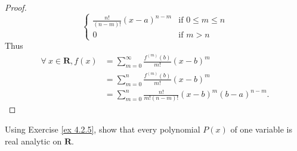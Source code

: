\begin{proof}
\[\begin{cases}
            \frac{n!}{(n - m)!} (x - a)^{n - m} & \text{if } 0 \leq m \leq n \\
            0                                   & \text{if } m > n
        \end{cases}
    \]
    Thus
    \begin{align*}
        \forall\ x \in \mathbf{R}, f(x) & = \sum_{m = 0}^\infty \frac{f^{(m)}(b)}{m!} (x - b)^m              \\
                                        & = \sum_{m = 0}^n \frac{f^{(m)}(b)}{m!} (x - b)^m                   \\
                                        & = \sum_{m = 0}^n \frac{n!}{m! (n - m)!} (x - b)^m (b - a)^{n - m}.
    \end{align*}
\end{proof}

\begin{exercise}\label{ex 4.2.6}
    Using Exercise \ref{ex 4.2.5}, show that every polynomial \(P(x)\) of one variable is real analytic on \(\mathbf{R}\).
\end{exercise}

